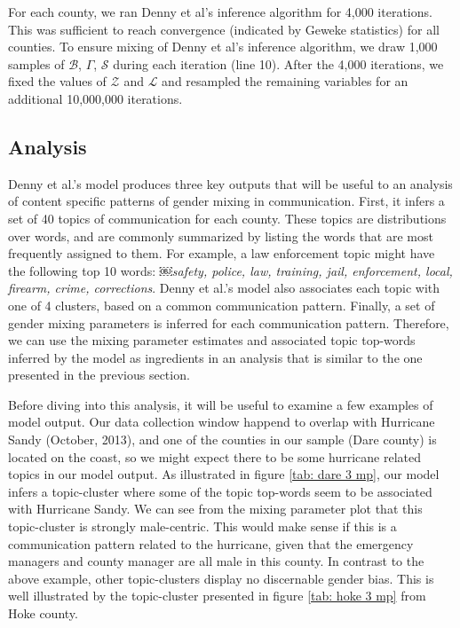\documentclass{pnastwo}
\begin{document}
\begin{article}
For each county, we ran Denny et al's inference algorithm for 4,000
iterations. This was sufficient to reach convergence (indicated by
Geweke statistics) for all counties. To ensure mixing of Denny et al's
inference algorithm, we draw 1,000 samples of $\mathcal{B}$, $\Gamma$,
$\mathcal{S}$ during each iteration (line 10). After the 4,000
iterations, we fixed the values of $\mathcal{Z}$ and $\mathcal{L}$ and
resampled the remaining variables for an additional 10,000,000
iterations.



\subsection{Analysis}
Denny et al.'s model produces three key outputs that will be useful to an analysis of content specific patterns of gender mixing in communication. First, it infers a set of 40 topics of communication for each county. These topics are distributions over words, and are commonly summarized by listing the words that are most frequently assigned to them. For example, a law enforcement topic might have the following top 10 words:
￼\emph{safety, police, law, training, jail, enforcement, local, firearm, crime, corrections}. Denny et al.'s model also associates each topic with one of 4 clusters, based on a common communication pattern. Finally, a set of gender mixing parameters is inferred for each communication pattern. Therefore, we can use the mixing parameter estimates and associated topic top-words inferred by the model as ingredients in an analysis that is similar to the one presented in the previous section.

Before diving into this analysis, it will be useful to examine a few examples of model output. Our data collection window happend to overlap with Hurricane Sandy (October, 2013), and one of the counties in our sample (Dare county) is located on the coast, so we might expect there to be some hurricane related topics in our model output. As illustrated in figure \ref{tab: dare 3 mp}, our model infers a topic-cluster where some of the topic top-words seem to be associated with Hurricane Sandy. We can see from the mixing parameter plot that this topic-cluster is strongly male-centric. This would make sense if this is a communication pattern related to the hurricane, given that the emergency managers and county manager are all male in this county. In contrast to the above example, other topic-clusters display no discernable gender bias. This is well illustrated by the topic-cluster presented in figure \ref{tab: hoke 3 mp} from Hoke county.


\end{article}
\end{document}
